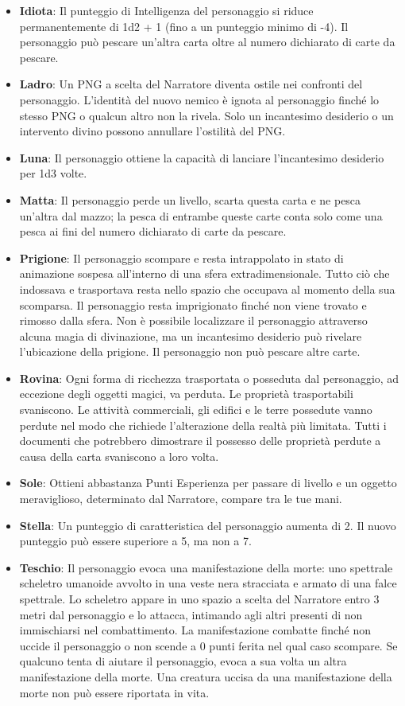 \begin{multicols}{2}
\begin{itemize}[leftmargin=*]
\item \textbf{Idiota}: Il punteggio di Intelligenza del personaggio si riduce permanentemente di 1d2 + 1 (fino a un punteggio minimo di -4). Il personaggio può pescare un’altra carta oltre al numero dichiarato di carte da pescare.
\item \textbf{Ladro}: Un PNG a scelta del Narratore diventa ostile nei confronti del personaggio. L'identità del nuovo nemico è ignota al personaggio finché lo stesso PNG o qualcun altro non la rivela. Solo un incantesimo desiderio o un intervento divino possono annullare l’ostilità del PNG.
\item \textbf{Luna}: Il personaggio ottiene la capacità di lanciare l'incantesimo desiderio per 1d3 volte.
\item \textbf{Matta}: Il personaggio perde un livello, scarta questa carta e ne pesca un’altra dal mazzo; la pesca di entrambe queste carte conta solo come una pesca ai fini del numero dichiarato di carte da pescare.
\item \textbf{Prigione}: Il personaggio scompare e resta intrappolato in stato di animazione sospesa all’interno di una sfera extradimensionale. Tutto ciò che indossava e trasportava resta nello spazio che occupava al momento della sua scomparsa. Il personaggio resta imprigionato finché non viene trovato e rimosso dalla sfera. Non è possibile localizzare il personaggio attraverso alcuna magia di divinazione, ma un incantesimo desiderio può rivelare l’ubicazione della prigione. Il personaggio non può pescare altre carte.
\item \textbf{Rovina}: Ogni forma di ricchezza trasportata o posseduta dal personaggio, ad eccezione degli oggetti magici, va perduta. Le proprietà trasportabili svaniscono. Le attività commerciali, gli edifici e le terre possedute vanno perdute nel modo che richiede l'alterazione della realtà più limitata. Tutti i documenti che potrebbero dimostrare il possesso delle proprietà perdute a causa della carta svaniscono a loro volta.
\item \textbf{Sole}: Ottieni abbastanza Punti Esperienza per passare di livello e un oggetto meraviglioso, determinato dal Narratore, compare tra le tue mani.
\item \textbf{Stella}: Un punteggio di caratteristica del personaggio aumenta di 2. Il nuovo punteggio può essere superiore a 5, ma non a 7.
\item \textbf{Teschio}: Il personaggio evoca una manifestazione della morte: uno spettrale scheletro umanoide avvolto in una veste nera stracciata e armato di una falce spettrale. Lo scheletro appare in uno spazio a scelta del Narratore entro 3 metri dal personaggio e lo attacca, intimando agli altri presenti di non immischiarsi nel combattimento. La manifestazione combatte finché non uccide il personaggio o non scende a 0 punti ferita nel qual caso scompare. Se qualcuno tenta di aiutare il personaggio, evoca a sua volta un altra manifestazione della morte. Una creatura uccisa da una manifestazione della morte non può essere riportata in vita.

\end{itemize}
\end{multicols}

